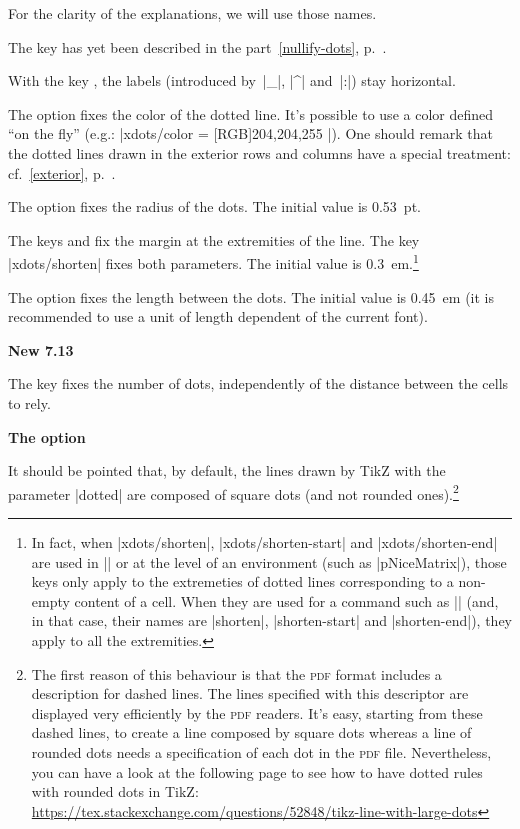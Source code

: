 \documentclass[dvipsnames]{article}
\begin{document}
For the clarity of the explanations, we will use those names.

\bigskip
The key  has yet been described in the
part~\ref{nullify-dots}, p.~\pageref{nullify-dots}.

\bigskip
With the key , the labels (introduced by~|_|,
|^| and~|:|) stay horizontal.

\bigskip
The option  fixes the color of the dotted line. It's
possible to use a color defined ``on the fly'' 
(e.g.: |xdots/color = { [RGB]{204,204,255} }|). One should remark that
the dotted lines drawn in the exterior rows and columns have a special
treatment: cf.~\ref{exterior}, p.~\pageref{exterior}. 

\bigskip
The option  fixes the radius of the dots. The initial value
is 0.53~pt.

\bigskip
The keys  and  fix
the margin at the extremities of the line. The key |xdots/shorten| fixes both
parameters. The initial value is 0.3~em.\footnote{In fact, when 
  |xdots/shorten|, |xdots/shorten-start| and |xdots/shorten-end| are used in
  |\NiceMatrixOptions| or at the level of an environment (such as
  |{pNiceMatrix}|), those keys only apply to the extremeties of dotted lines
  corresponding to a non-empty content of a cell. When they are used for a command
  such as |\Cdots| (and, in that case, their names are |shorten|,
  |shorten-start| and |shorten-end|), they apply to all the extremities.}

\bigskip
The option  fixes the length between the dots. The
initial value is 0.45~em (it is recommended to use a unit of length dependent of
the current font).

\medskip
\colorbox{yellow!50}{\bfseries{New 7.13}}

\nobreak
\smallskip
The key  fixes the number of dots,
independently of the distance between the cells to rely.


\bigskip
\textbf{The option }

\nobreak
\smallskip
It should be pointed that, by default, the lines drawn by TikZ with the
parameter |dotted| are composed of square dots (and not rounded
ones).\footnote{The first reason of this behaviour is that the \textsc{pdf}
format includes a description for dashed lines. The lines specified with this
descriptor are displayed very efficiently by the \textsc{pdf} readers. It's
easy, starting from these dashed lines,
to create a line composed by square dots whereas a line of rounded dots needs
a specification of each dot in the \textsc{pdf} file. Nevertheless, you can
have a look at the following page to see how to have dotted rules with rounded
dots in TikZ:\newline \small
\url{https://tex.stackexchange.com/questions/52848/tikz-line-with-large-dots}}
\end{document}
